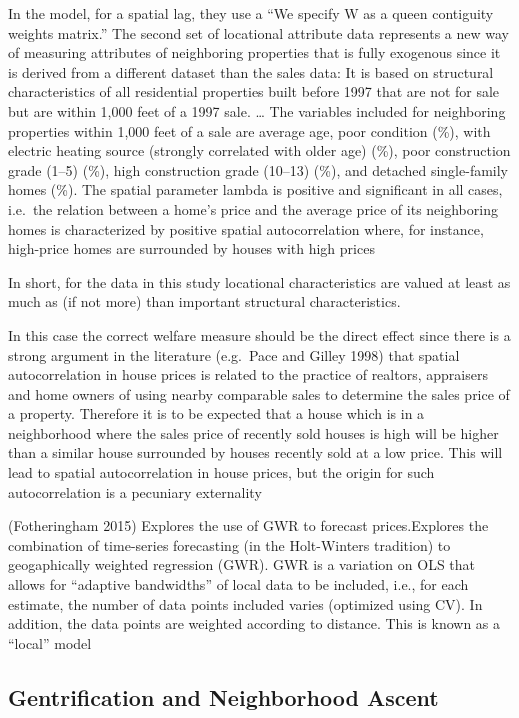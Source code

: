 \documentclass[]{article}
\begin{document}
In the model, for a spatial lag, they use a ``We specify W as a queen
contiguity weights matrix.'' The second set of locational attribute data
represents a new way of measuring attributes of neighboring properties
that is fully exogenous since it is derived from a different dataset
than the sales data: It is based on structural characteristics of all
residential properties built before 1997 that are not for sale but are
within 1,000 feet of a 1997 sale. \ldots{} The variables included for
neighboring properties within 1,000 feet of a sale are average age, poor
condition (\%), with electric heating source (strongly correlated with
older age) (\%), poor construction grade (1--5) (\%), high construction
grade (10--13) (\%), and detached single-family homes (\%). The spatial
parameter lambda is positive and significant in all cases, i.e.~the
relation between a home's price and the average price of its neighboring
homes is characterized by positive spatial autocorrelation where, for
instance, high-price homes are surrounded by houses with high prices

In short, for the data in this study locational characteristics are
valued at least as much as (if not more) than important structural
characteristics.

In this case the correct welfare measure should be the direct effect
since there is a strong argument in the literature (e.g.~Pace and Gilley
1998) that spatial autocorrelation in house prices is related to the
practice of realtors, appraisers and home owners of using nearby
comparable sales to determine the sales price of a property. Therefore
it is to be expected that a house which is in a neighborhood where the
sales price of recently sold houses is high will be higher than a
similar house surrounded by houses recently sold at a low price. This
will lead to spatial autocorrelation in house prices, but the origin for
such autocorrelation is a pecuniary externality

(Fotheringham 2015) Explores the use of GWR to forecast prices.Explores
the combination of time-series forecasting (in the Holt-Winters
tradition) to geogaphically weighted regression (GWR). GWR is a
variation on OLS that allows for ``adaptive bandwidths'' of local data
to be included, i.e., for each estimate, the number of data points
included varies (optimized using CV). In addition, the data points are
weighted according to distance. This is known as a ``local'' model

\subsection{Gentrification and Neighborhood
Ascent}\label{gentrification-and-neighborhood-ascent}
\end{document}
